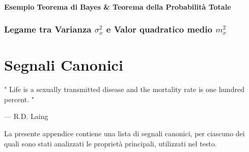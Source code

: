 \documentclass[12pt,oneside,openany]{memoir}
\numberwithin{equation}{subsection}
\begin{document}
\newpage
\subsubsection{Esempio Teorema di Bayes \& Teorema della Probabilit\`a Totale}

\newpage
\subsection{Legame tra Varianza $\sigma_x^2$ e Valor quadratico medio $m_x^2$}


\appendix


\chapter{Segnali Canonici}
\epigraph{"
	Life is a sexually transmitted disease and the mortality rate is one
	hundred percent.
"}{--- \textup{R.D. Laing}}
La presente appendice contiene una lista di segnali canonici, per ciascuno dei
quali sono stati analizzati le propriet\`a principali, utilizzati nel testo.

\end{document}
